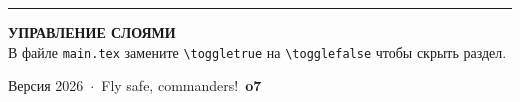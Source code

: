 \vspace{2mm}
{\color{edorangedim}\rule{\linewidth}{0.3pt}}
\vspace{1.5mm}

\begin{tcolorbox}[
  colback=edboxbg, colframe=edgray, arc=0mm,
  left=1.5mm, right=1.5mm, top=1mm, bottom=1mm,
  boxrule=0.2mm,
]
{\color{edgray}\fontsize{5.5}{7}\selectfont\bfseries\MakeUppercase{Управление слоями}}\\[0.5mm]
{\color{edgraytext}\fontsize{5.5}{6.5}\selectfont
  В файле \texttt{main.tex} замените \texttt{\textbackslash toggletrue} на
  \texttt{\textbackslash togglefalse} чтобы скрыть раздел.}
\end{tcolorbox}

\vspace{1.5mm}

\begin{center}
{\color{edgray}\fontsize{5.5}{6.5}\selectfont
  Версия 2026~$\cdot$~Fly safe, commanders!~\textbf{o7}}
\end{center}
